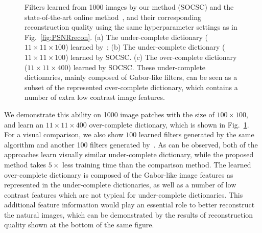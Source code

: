 \begin{figure}[h]
\begin{minipage}{1\textwidth}
    \centering
\end{minipage}
\caption{Filters learned from 1000 images by our method (SOCSC) and the state-of-the-art online method~\cite{liu-2018-first}, and their corresponding reconstruction quality using the same hyperparameter settings as in Fig.~\ref{fig:PSNRrecon}. (a) The under-complete dictionary ($11 \times 11 \times 100$) learned by~\cite{liu-2018-first}; (b) The under-complete dictionary ($11 \times 11 \times 100$) learned by SOCSC. (c) The over-complete dictionary ($11 \times 11 \times 400$) learned by SOCSC. These under-complete dictionaries, mainly composed of Gabor-like filters, can be seen as a subset of the represented over-complete dictionary, which contains a number of extra low contrast image features.}
\label{fig:overCompleteDic}
\end{figure}

We demonstrate this ability on 1000 image patches with the size of
$100 \times 100$, and learn an $11 \times 11 \times 400$ over-complete
dictionary, which is shown in Fig.~\ref{fig:overCompleteDic}. For a
visual comparison, we also show $100$ learned filters generated by the
same algorithm and another 100 filters generated
by~\cite{liu-2018-first}. As can be observed, both of the approaches
learn visually similar under-complete dictionary, while the proposed
method takes $5 \times$ less training time than the comparison
method. The learned over-complete dictionary is composed of
the Gabor-like image features as represented in the under-complete
dictionaries, as well as a number of low contrast features which are
not typical for under-complete dictionaries. This additional
feature information would play an essential role to better reconstruct
the natural images, which can be demonstrated by the results of
reconstruction quality shown at the bottom of the same figure.

